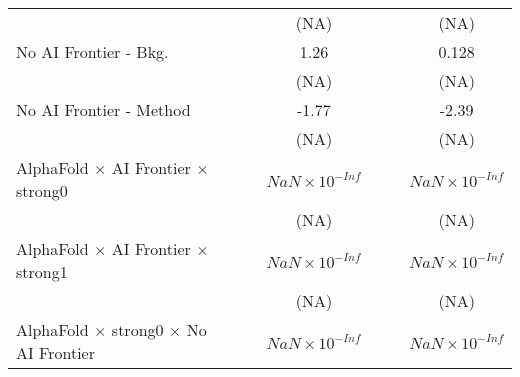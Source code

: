 \begin{tabular}{lcccccc}
                                                                              &                        &                        & (NA)                   &                        &                        & (NA)\\   
   No AI Frontier - Bkg.                                                      &                        &                        & 1.26                   &                        &                        & 0.128\\   
                                                                              &                        &                        & (NA)                   &                        &                        & (NA)\\   
   No AI Frontier - Method                                                    &                        &                        & -1.77                  &                        &                        & -2.39\\   
                                                                              &                        &                        & (NA)                   &                        &                        & (NA)\\   
   AlphaFold $\times$ AI Frontier $\times$ strong0                            &                        &                        & $NaN\times 10^{-Inf}$  &                        &                        & $NaN\times 10^{-Inf}$\\    
                                                                              &                        &                        & (NA)                   &                        &                        & (NA)\\   
   AlphaFold $\times$ AI Frontier $\times$ strong1                            &                        &                        & $NaN\times 10^{-Inf}$  &                        &                        & $NaN\times 10^{-Inf}$\\    
                                                                              &                        &                        & (NA)                   &                        &                        & (NA)\\   
   AlphaFold $\times$ strong0 $\times$ No AI Frontier                         &                        &                        & $NaN\times 10^{-Inf}$  &                        &                        & $NaN\times 10^{-Inf}$\\    

\end{tabular}
